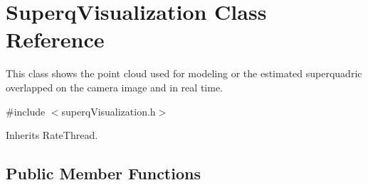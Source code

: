 \section{Superq\-Visualization Class Reference}
\label{classSuperqVisualization}


This class shows the point cloud used for modeling or the estimated superquadric overlapped on the camera image and in real time.  




{\ttfamily \#include $<$superq\-Visualization.\-h$>$}



Inherits Rate\-Thread.

\subsection*{Public Member Functions}
